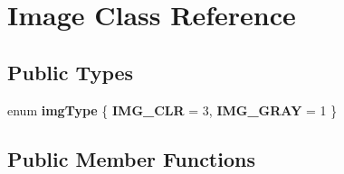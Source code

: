 \hypertarget{class_image}{\section{Image Class Reference}
\label{class_image}
}
\subsection*{Public Types}
\begin{DoxyCompactItemize}
\item 
enum {\bfseries img\-Type} \{ {\bfseries I\-M\-G\-\_\-\-C\-L\-R} =  3, 
{\bfseries I\-M\-G\-\_\-\-G\-R\-A\-Y} =  1
 \}
\end{DoxyCompactItemize}
\subsection*{Public Member Functions}
